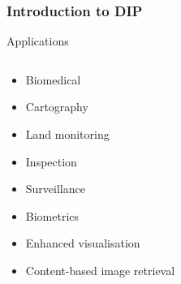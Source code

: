 \documentclass{beamer}
\begin{document}
\begin{frame}
  \frametitle{Introduction to DIP}
  \begin{block}{Applications}
    \begin{columns}
      \begin{column}{.4\linewidth}
        \begin{itemize}
        \item<1-> Biomedical
        \item<2-> Cartography
        \item<3-> Land monitoring
        \item<4-> Inspection
        \item<5-> Surveillance
        \item<6-> Biometrics
        \item<7-> Enhanced visualisation
        \item<8-> Content-based image retrieval 
        \end{itemize}
      \end{column}
      \begin{column}{.6\linewidth}
\end{column}
\end{columns}
\end{block}
\end{frame}
\end{document}
